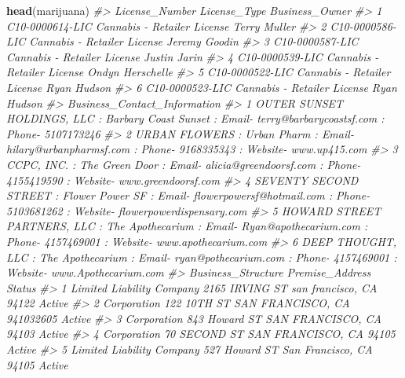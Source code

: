 \documentclass[
  12pt,
]{book}
\newenvironment{Shaded}{\begin{snugshade}}{\end{snugshade}}
\newcommand{\CommentTok}[1]{\textcolor[rgb]{0.37,0.37,0.37}{\textit{#1}}}
\newcommand{\KeywordTok}[1]{\textcolor[rgb]{0.27,0.27,0.27}{\textbf{#1}}}
\newcommand{\NormalTok}[1]{#1}
\begin{document}
\begin{Shaded}
\begin{Highlighting}[]
\KeywordTok{head}\NormalTok{(marijuana)}
\CommentTok{\#\textgreater{}    License\_Number                License\_Type   Business\_Owner}
\CommentTok{\#\textgreater{} 1 C10{-}0000614{-}LIC Cannabis {-} Retailer License     Terry Muller}
\CommentTok{\#\textgreater{} 2 C10{-}0000586{-}LIC Cannabis {-} Retailer License    Jeremy Goodin}
\CommentTok{\#\textgreater{} 3 C10{-}0000587{-}LIC Cannabis {-} Retailer License     Justin Jarin}
\CommentTok{\#\textgreater{} 4 C10{-}0000539{-}LIC Cannabis {-} Retailer License Ondyn Herschelle}
\CommentTok{\#\textgreater{} 5 C10{-}0000522{-}LIC Cannabis {-} Retailer License      Ryan Hudson}
\CommentTok{\#\textgreater{} 6 C10{-}0000523{-}LIC Cannabis {-} Retailer License      Ryan Hudson}
\CommentTok{\#\textgreater{}                                                                                                           Business\_Contact\_Information}
\CommentTok{\#\textgreater{} 1                             OUTER SUNSET HOLDINGS, LLC  : Barbary Coast Sunset : Email{-} terry@barbarycoastsf.com : Phone{-} 5107173246}
\CommentTok{\#\textgreater{} 2                           URBAN FLOWERS  : Urban Pharm : Email{-} hilary@urbanpharmsf.com : Phone{-} 9168335343 : Website{-} www.up415.com}
\CommentTok{\#\textgreater{} 3                      CCPC, INC.  : The Green Door : Email{-} alicia@greendoorsf.com : Phone{-} 4155419590 : Website{-} www.greendoorsf.com}
\CommentTok{\#\textgreater{} 4 SEVENTY SECOND STREET  : Flower Power SF : Email{-} flowerpowersf@hotmail.com : Phone{-} 5103681262 : Website{-} flowerpowerdispensary.com}
\CommentTok{\#\textgreater{} 5   HOWARD STREET PARTNERS, LLC  : The Apothecarium : Email{-} Ryan@apothecarium.com : Phone{-} 4157469001 : Website{-} www.apothecarium.com}
\CommentTok{\#\textgreater{} 6              DEEP THOUGHT, LLC  : The Apothecarium : Email{-} ryan@pothecarium.com : Phone{-} 4157469001 : Website{-} www.Apothecarium.com}
\CommentTok{\#\textgreater{}          Business\_Structure                         Premise\_Address Status}
\CommentTok{\#\textgreater{} 1 Limited Liability Company  2165 IRVING ST san francisco, CA 94122 Active}
\CommentTok{\#\textgreater{} 2               Corporation 122 10TH ST SAN FRANCISCO, CA 941032605 Active}
\CommentTok{\#\textgreater{} 3               Corporation   843 Howard ST SAN FRANCISCO, CA 94103 Active}
\CommentTok{\#\textgreater{} 4               Corporation    70 SECOND ST SAN FRANCISCO, CA 94105 Active}
\CommentTok{\#\textgreater{} 5 Limited Liability Company   527 Howard ST San Francisco, CA 94105 Active}

\end{Highlighting}
\end{Shaded}
\end{document}
